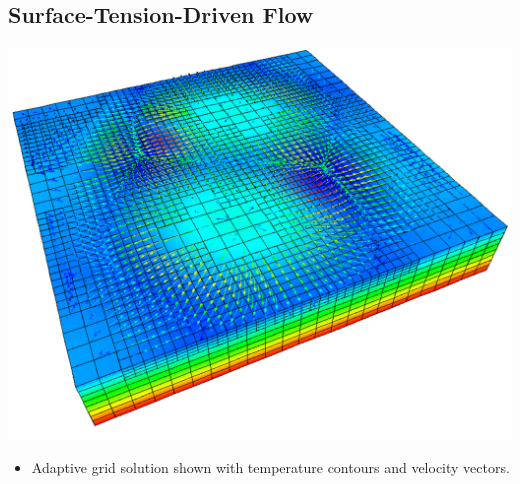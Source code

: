 \subsection*{Surface-Tension-Driven Flow}
\begin{frame}[t]
  \begin{center}
    \includegraphics[width=.6\textwidth]{figures/rbm_adapt_soln}    
  \end{center}

  \begin{block}{}
    \begin{itemize}
    \item{Adaptive grid solution shown
      with temperature contours and velocity vectors.
      }
      \end{itemize}
  \end{block}
\end{frame}
